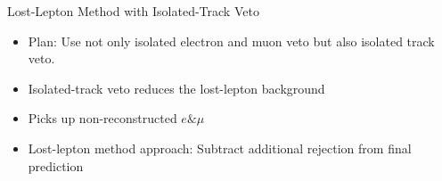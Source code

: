 \documentclass{beamer}
\begin{document}
\begin{frame}
 \begin{block}{}
 \centering
 \Large Lost-Lepton Method with Isolated-Track Veto
 \end{block}
\end{frame}

\begin{frame}
 \begin{itemize}
  \item Plan: Use not only isolated electron and muon veto but also isolated track veto.
  \item Isolated-track veto reduces the lost-lepton background
  \item Picks up non-reconstructed $e\& \mu$
  \item Lost-lepton method approach: Subtract additional rejection from final prediction
 \end{itemize}
\end{frame}
\end{document}
